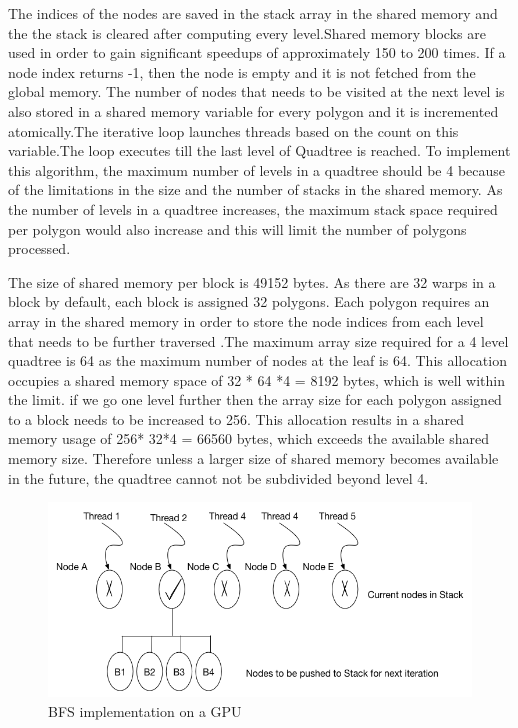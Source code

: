 \documentclass{article}
\begin{document}
The indices of the nodes are saved in the stack array in the shared memory and the the stack is cleared after computing every level.Shared memory blocks are used in order to gain significant speedups of approximately 150 to 200 times. If a node index returns -1, then the node is empty and it is not fetched from the global memory.
The number of nodes that needs to be visited  at the next level is also stored in a shared memory variable for every polygon and it is incremented atomically.The iterative loop launches threads based on the count on this variable.The loop executes till the last level of Quadtree is reached.
To implement this algorithm, the maximum number of levels in a quadtree should be 4 because of the limitations in the size and the number of stacks in the  shared memory. As the number of levels in a quadtree increases, the maximum stack space required per polygon would also increase and this will limit the number of polygons processed.

The size of shared memory per block is 49152 bytes. As there are 32 warps in a block by default, each block is assigned  32 polygons. Each polygon requires an array in the shared memory in order to store the node indices from each level that needs to be further traversed .The maximum array size required for a 4 level quadtree is 64 as the maximum number of nodes at the leaf is 64. This allocation occupies a shared memory space of 32 * 64 *4 = 8192 bytes, which is well within the limit. if we go one level further then the array size for each polygon assigned to a block needs to be increased to 256. This allocation results in a shared memory usage of 256* 32*4  = 66560 bytes, which exceeds the available shared memory size. Therefore unless a larger size of shared memory becomes available in the future, the quadtree cannot not be subdivided beyond level 4.

\begin{figure}[ht]
\includegraphics[scale=0.5]{BFS}
\caption{BFS implementation on a GPU}
\end{figure}
\end{document}
